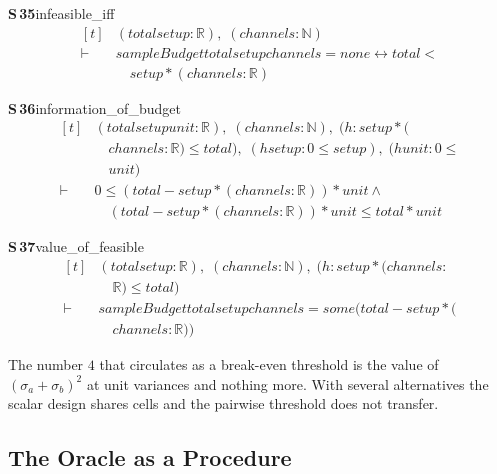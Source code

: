 \documentclass[conference]{IEEEtran}
\theoremstyle{definition}
\newcommand{\lean}[1]{\textsf{\footnotesize #1}}
\begin{document}
\noindent\textbf{S\,35}\quad\lean{infeasible\_iff}
{\footnotesize\[ \begin{aligned}[t]
&(\mathit{total} \mathit{setup} : \mathbb{R} ),\; (\mathit{channels} : \mathbb{N} )\\
\vdash\;&\mathit{sampleBudget} \mathit{total} \mathit{setup} \mathit{channels} = \mathit{none} \leftrightarrow \mathit{total} <\\
&\quad \mathit{setup} * (\mathit{channels} : \mathbb{R} )
\end{aligned} \]}

\noindent\textbf{S\,36}\quad\lean{information\_of\_budget}
{\footnotesize\[ \begin{aligned}[t]
&(\mathit{total} \mathit{setup} \mathit{unit} : \mathbb{R} ),\; (\mathit{channels} : \mathbb{N} ),\; (\mathit{h} : \mathit{setup} * (\\
&\quad \mathit{channels} : \mathbb{R} ) \leq \mathit{total}),\; (\mathit{hsetup} : 0 \leq \mathit{setup}),\; (\mathit{hunit} : 0 \leq\\
&\quad \mathit{unit})\\
\vdash\;&0 \leq (\mathit{total} - \mathit{setup} * (\mathit{channels} : \mathbb{R} )) * \mathit{unit} \wedge\\
&\quad (\mathit{total} - \mathit{setup} * (\mathit{channels} : \mathbb{R} )) * \mathit{unit} \leq \mathit{total} * \mathit{unit}
\end{aligned} \]}

\noindent\textbf{S\,37}\quad\lean{value\_of\_feasible}
{\footnotesize\[ \begin{aligned}[t]
&(\mathit{total} \mathit{setup} : \mathbb{R} ),\; (\mathit{channels} : \mathbb{N} ),\; (\mathit{h} : \mathit{setup} * (\mathit{channels} :\\
&\quad \mathbb{R} ) \leq \mathit{total})\\
\vdash\;&\mathit{sampleBudget} \mathit{total} \mathit{setup} \mathit{channels} = \mathit{some} (\mathit{total} - \mathit{setup} * (\\
&\quad \mathit{channels} : \mathbb{R} ))
\end{aligned} \]}


The number $4$ that circulates as a break-even threshold is the value of
$(\sigma_{a}+\sigma_{b})^{2}$ at unit variances and nothing more. With several alternatives
the scalar design shares cells and the pairwise threshold does not transfer.

\subsection{The Oracle as a Procedure}
\label{sec:procedure}
\end{document}
